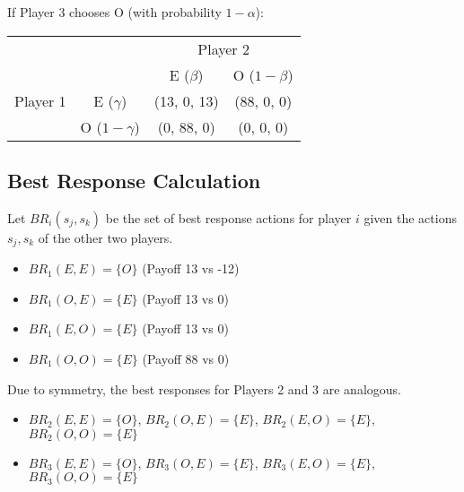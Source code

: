 \documentclass{article}
\begin{document}
If Player 3 chooses O (with probability $1-\alpha$):
\begin{center}
\begin{tabular}{cc|c|c|}
\multicolumn{2}{c}{ } & \multicolumn{2}{c}{Player 2} \\
\multicolumn{2}{c}{ } & \multicolumn{1}{c}{E ($\beta$)} & \multicolumn{1}{c}{O ($1-\beta$)} \\ \cline{3-4}
  Player 1 & E ($\gamma$) & (13, 0, 13) & (88, 0, 0) \\ \cline{3-4}
  & O ($1-\gamma$) & (0, 88, 0) & (0, 0, 0) \\ \cline{3-4}
\end{tabular}
\end{center}

\subsection{Best Response Calculation}
Let $BR_i(s_j, s_k)$ be the set of best response actions for player $i$ given the actions $s_j, s_k$ of the other two players.
\begin{itemize}
    \item $BR_1(E, E) = \{O\}$ (Payoff 13 vs -12)
    \item $BR_1(O, E) = \{E\}$ (Payoff 13 vs 0)
    \item $BR_1(E, O) = \{E\}$ (Payoff 13 vs 0)
    \item $BR_1(O, O) = \{E\}$ (Payoff 88 vs 0)
\end{itemize}
Due to symmetry, the best responses for Players 2 and 3 are analogous.
\begin{itemize}
    \item $BR_2(E, E) = \{O\}$, $BR_2(O, E) = \{E\}$, $BR_2(E, O) = \{E\}$, $BR_2(O, O) = \{E\}$
    \item $BR_3(E, E) = \{O\}$, $BR_3(O, E) = \{E\}$, $BR_3(E, O) = \{E\}$, $BR_3(O, O) = \{E\}$
\end{itemize}
\end{document}
